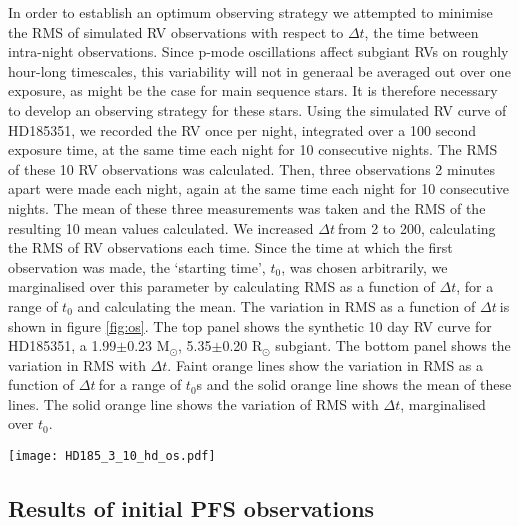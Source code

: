 \documentclass[useAMS, usenatbib]{aastex}
\newcommand{\dt}{$\Delta t$}
\begin{document}
In order to establish an optimum observing strategy we attempted to minimise
the RMS of simulated RV observations with respect to \dt, the time between
intra-night observations.
Since p-mode oscillations affect subgiant RVs on roughly hour-long timescales,
this variability will not in generaal be averaged out over one exposure, as
might be the case for main sequence stars.
It is therefore necessary to develop an observing strategy for these stars.
Using the simulated RV curve of HD185351, we recorded the RV once per night,
integrated over a 100 second exposure time, at the same time each night for 10 consecutive nights.
The RMS of these 10 RV observations was calculated.
Then, three observations 2 minutes apart were made each night, again at the
same time each night for 10 consecutive nights.
The mean of these three measurements was taken and the RMS of the resulting 10
mean values calculated.
We increased \dt$~$from 2 to 200, calculating the RMS of RV observations
each time.
Since the time at which the first observation was made, the `starting time',
$t_0$, was chosen arbitrarily, we marginalised over this parameter by
calculating RMS as a function of \dt, for a range of $t_0$ and calculating the
mean.
The variation in RMS as a function of \dt$~$is shown in figure \ref{fig:os}.
The top panel shows the synthetic 10 day RV curve for HD185351, a 1.99$\pm$0.23
M$_\odot$, 5.35$\pm$0.20 R$_\odot$ subgiant.
The bottom panel shows the variation in RMS with \dt.
Faint orange lines show the variation in RMS as a function of \dt$~$for a range
of $t_0$s and the solid orange line shows the mean of these lines.
The solid orange line shows the variation of RMS with \dt, marginalised over
$t_0$.

\begin{figure*}
\begin{center}
\texttt{[image: HD185\_3\_10\_hd\_os.pdf]}
\caption{{\it (Top)} Synthetic 10 day RV curve for HD185351, a 1.99$\pm$0.23
M$_\odot$, 5.35$\pm$0.20 R$_\odot$ subgiant. {\it(Bottom)} RMS vs \dt. The
faint orange lines show the variation in RMS as a function of \dt$~$for a range
of starting times. The solid orange line shows the mean of these lines. The
solid orange line shows the effect of marginalising over the starting times.}
\label{fig:os}
\end{center}
\end{figure*}

\subsection{Results of initial PFS observations}
\end{document}
